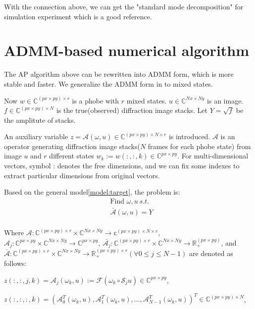 \documentclass{article}
\numberwithin{equation}{section}
\begin{document}
With the connection above, we can get the "standard mode decomposition" for simulation experiment which is a good reference.


\section{ADMM-based numerical algorithm}

The AP algorithm above can be rewritten into ADMM form, which is more stable and faster. We generalize the ADMM form in \cite{admm} to mixed states.

Now $w \in \mathbb{C}^{(px\times py) \times r}$ is a phobe with $r$ mixed states. $u \in \mathbb{C}^{Nx\times Ny}$ is an image.  $f \in \mathbb{C}^{(px \times py) \times N}$ is the true(observed) diffraction image stacks. Let $Y=\sqrt{f}$ be the amplitute of stacks.

An auxiliary variable $z=\mathcal{A}(\omega, u) \in \mathbb{C}^{(px \times py) \times N \times r}$ is introduced. $\mathcal{A}$ is an operator generating diffraction image stacks($N$ frames for each phobe state) from image $u$ and $r$ different states $w_k:=w(:,:,k) \in \mathbb{C}^{px \times py}$. For multi-dimensional vectors, symbol : denotes the free dimensions, and we can fix some indexes to extract particular dimensions from original vectors.  

Based on the general model\ref{model:target}, the problem is:
$$
\begin{aligned}
&\mbox{Find } \omega,u \ s.t.\\
& \bar{\mathcal{A}}(\omega, u)=Y\\
\end{aligned}
$$


Where $\mathcal{A}: \mathbb{C}^{(px\times py)\times r} \times \mathbb{C}^{Nx \times Ny} \rightarrow \mathbb{c}^{(px \times py) \times N \times r}$,$\mathcal{A}_{j}: \mathbb{C}^{px\times py} \times \mathbb{C}^{Nx \times Ny} \rightarrow \mathbb{C}^{px\times py} $,
$\bar{\mathcal{A}_j}:\mathbb{C}^{(px\times py)\times r} \times \mathbb{C}^{Nx \times Ny} \rightarrow \mathbb{R}_+^{(px \times py)}$, and $\bar{\mathcal{A}}:\mathbb{C}^{(px\times py)\times r} \times \mathbb{C}^{Nx \times Ny} \rightarrow \mathbb{R}_+^{(px \times py) \times r} (\forall 0 \leq j \leq N-1)$ are
denoted as follows:

$z(:,:,j,k) = \mathcal{A}_{j}(\omega_k, u):=\mathcal{F}\left(\omega_k \circ \mathcal{S}_{j} u\right) \in \mathbb{C}^{px\times py}$,

$z(:,:,:,k) =\left(\mathcal{A}_{0}^{T}(\omega_k, u), \mathcal{A}_{1}^{T}(\omega_k, u), \ldots, \mathcal{A}_{N-1}^{T}(\omega_k, u)\right)^{T} 
\in \mathbb{C}^{(px\times py) \times N}$,
\end{document}
